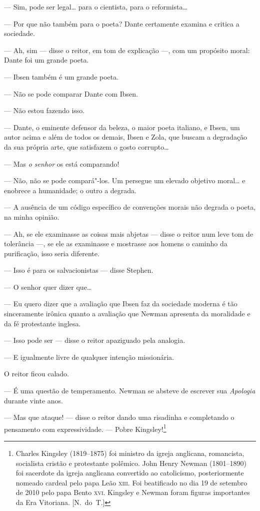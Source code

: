--- Sim, pode ser legal\ldots{} para o cientista, para o reformista\ldots{}

--- Por que não também para o poeta?  Dante certamente examina e
critica a sociedade.

--- Ah, sim --- disse o reitor, em tom de explicação ---, com um
propósito moral: Dante foi um grande poeta.

--- Ibsen também é um grande poeta.

--- Não se pode comparar Dante com Ibsen.

--- Não estou fazendo isso.

--- Dante, o eminente defensor da beleza, o maior poeta italiano,
e Ibsen, um autor acima e além de todos os demais, Ibsen e Zola, que
buscam a degradação da sua própria arte, que satisfazem o gosto
corrupto\ldots{}

--- Mas \textit{o senhor} os está comparando!

--- Não, não se pode compará"-los.  Um persegue um elevado
objetivo moral\ldots{} e enobrece a humanidade; o outro a degrada.

--- A ausência de um código específico de convenções morais não
degrada o poeta, na minha opinião.

--- Ah, se ele examinasse as coisas mais abjetas --- disse o reitor
num leve tom de tolerância ---, se ele as examinasse e mostrasse aos
homens o caminho da purificação, isso seria diferente.

--- Isso é para os salvacionistas --- disse Stephen.

--- O senhor quer dizer que\ldots{}

--- Eu quero dizer que a avaliação que Ibsen faz da sociedade
moderna é tão sinceramente irônica quanto a avaliação que Newman
apresenta da moralidade e da fé protestante inglesa.

--- Isso pode ser --- disse o reitor apaziguado pela analogia.

--- E igualmente livre de qualquer intenção missionária.

O reitor ficou calado.

--- É uma questão de temperamento.  Newman se absteve de escrever
sua \textit{Apologia} durante vinte anos.

--- Mas que ataque! --- disse o reitor dando uma risadinha e completando o
pensamento com expressividade.  --- Pobre Kingsley!\footnote{ Charles Kingsley
(1819--1875) foi ministro da igreja anglicana, romancista, socialista cristão e
protestante polêmico.  John Henry Newman (1801--1890) foi sacerdote da igreja
anglicana convertido ao catolicismo, posteriormente nomeado cardeal pelo papa
Leão \textsc{xiii}.  Foi beatificado no dia 19 de setembro de 2010 pelo papa Bento \textsc{xvi}.
Kingsley e Newman foram figuras importantes da Era Vitoriana. [N.~do~T.]}

